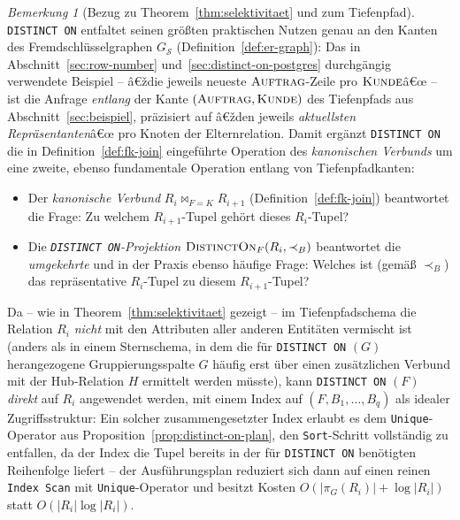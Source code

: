 ﻿\documentclass[a4paper,12pt]{report}
\theoremstyle{definition}
\theoremstyle{remark}
\newtheorem{remark}{Bemerkung}[chapter]
\begin{document}
\begin{remark}[Bezug zu Theorem~\ref{thm:selektivitaet} und
zum Tiefenpfad]
\label{rem:distinct-on-tiefenpfad}
\texttt{DISTINCT ON} entfaltet seinen größten praktischen Nutzen genau
an den Kanten des Fremdschlüsselgraphen $G_{\mathcal{S}}$
(Definition~\ref{def:er-graph}): Das in
Abschnitt~\ref{sec:row-number} und~\ref{sec:distinct-on-postgres}
durchgängig verwendete Beispiel -- â€ždie jeweils neueste
$\textsc{Auftrag}$-Zeile pro $\textsc{Kunde}$â€œ -- ist die Anfrage
\emph{entlang} der Kante $(\textsc{Auftrag},\textsc{Kunde})$ des
Tiefenpfads aus Abschnitt~\ref{sec:beispiel}, präzisiert auf
â€žden jeweils \emph{aktuellsten Repräsentanten}â€œ pro Knoten der
Elternrelation. Damit ergänzt \texttt{DISTINCT ON} die in
Definition~\ref{def:fk-join} eingeführte Operation des
\emph{kanonischen Verbunds} um eine zweite, ebenso fundamentale
Operation entlang von Tiefenpfadkanten:

\begin{itemize}
  \item Der \emph{kanonische Verbund} $R_i\Join_{F=K}R_{i+1}$
    (Definition~\ref{def:fk-join}) beantwortet die Frage:
    \glqq Zu welchem $R_{i+1}$-Tupel gehört dieses
    $R_i$-Tupel?\grqq{}
  \item Die \emph{\texttt{DISTINCT ON}-Projektion}
    $\textsc{DistinctOn}_{F}(R_i,\prec_B)$ beantwortet die
    \emph{umgekehrte} und in der Praxis ebenso häufige Frage:
    \glqq Welches ist (gemäß $\prec_B$) das repräsentative
    $R_i$-Tupel zu diesem $R_{i+1}$-Tupel?\grqq{}
\end{itemize}

Da -- wie in Theorem~\ref{thm:selektivitaet} gezeigt -- im
Tiefenpfadschema die Relation $R_i$ \emph{nicht} mit den Attributen
aller anderen Entitäten vermischt ist (anders als in einem
Sternschema, in dem die für \texttt{DISTINCT ON} $(G)$
herangezogene Gruppierungsspalte $G$ häufig erst über einen
zusätzlichen Verbund mit der Hub-Relation $H$ ermittelt werden müsste),
kann \texttt{DISTINCT ON} $(F)$ \emph{direkt} auf $R_i$ angewendet
werden, mit einem Index auf $(F,B_1,\ldots,B_q)$ als idealer
Zugriffsstruktur: Ein solcher zusammengesetzter Index erlaubt es dem
\texttt{Unique}-Operator aus
Proposition~\ref{prop:distinct-on-plan}, den
\texttt{Sort}-Schritt vollständig zu entfallen, da der Index die
Tupel bereits in der für \texttt{DISTINCT ON} benötigten Reihenfolge
liefert -- der Ausführungsplan reduziert sich dann auf einen reinen
\texttt{Index Scan} mit \texttt{Unique}-Operator und besitzt Kosten
$O(|\pi_G(R_i)|+\log|R_i|)$ statt $O(|R_i|\log|R_i|)$.
\end{remark}
\end{document}
